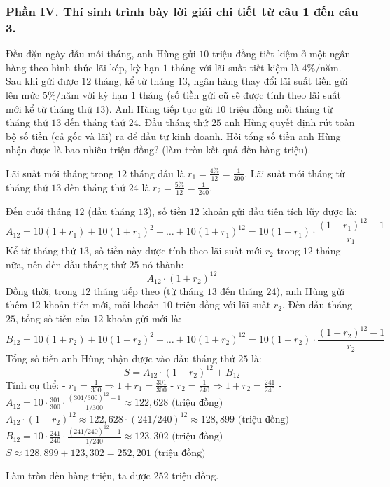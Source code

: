 \subsubsection*{Phần IV. Thí sinh trình bày lời giải chi tiết từ câu 1 đến câu 3.}
\setcounter{bt}{0}
\begin{baitap}
	Đều đặn ngày đầu mỗi tháng, anh Hùng gửi $10$ triệu đồng tiết kiệm ở một ngân hàng theo hình thức lãi kép, kỳ hạn $1$ tháng với lãi suất tiết kiệm là $4\%/\text{năm}$. Sau khi gửi được $12$ tháng, kể từ tháng $13$, ngân hàng thay đổi lãi suất tiền gửi lên mức $5\%/\text{năm}$ với kỳ hạn $1$ tháng (số tiền gửi cũ sẽ được tính theo lãi suất mới kể từ tháng thứ $13$). Anh Hùng tiếp tục gửi $10$ triệu đồng mỗi tháng từ tháng thứ $13$ đến tháng thứ $24$. Đầu tháng thứ $25$ anh Hùng quyết định rút toàn bộ số tiền (cả gốc và lãi) ra để đầu tư kinh doanh. Hỏi tổng số tiền anh Hùng nhận được là bao nhiêu triệu đồng? (làm tròn kết quả đến hàng triệu).
	\begin{traloi}
		
		Lãi suất mỗi tháng trong $12$ tháng đầu là $r_1 = \frac{4\%}{12} = \frac{1}{300}$.
		Lãi suất mỗi tháng từ tháng thứ $13$ đến tháng thứ $24$ là $r_2 = \frac{5\%}{12} = \frac{1}{240}$.
		
		Đến cuối tháng $12$ (đầu tháng $13$), số tiền $12$ khoản gửi đầu tiên tích lũy được là:
		\[
		A_{12} = 10(1 + r_1) + 10(1 + r_1)^2 + \ldots + 10(1 + r_1)^{12} = 10(1 + r_1) \cdot \frac{(1 + r_1)^{12} - 1}{r_1}
		\]
		Kể từ tháng thứ $13$, số tiền này được tính theo lãi suất mới $r_2$ trong $12$ tháng nữa, nên đến đầu tháng thứ $25$ nó thành:
		\[
		A_{12} \cdot (1 + r_2)^{12}
		\]
		Đồng thời, trong $12$ tháng tiếp theo (từ tháng $13$ đến tháng $24$), anh Hùng gửi thêm $12$ khoản tiền mới, mỗi khoản $10$ triệu đồng với lãi suất $r_2$. Đến đầu tháng $25$, tổng số tiền của $12$ khoản gửi mới là:
		\[
		B_{12} = 10(1 + r_2) + 10(1 + r_2)^2 + \ldots + 10(1 + r_2)^{12} = 10(1 + r_2) \cdot \frac{(1 + r_2)^{12} - 1}{r_2}
		\]
		Tổng số tiền anh Hùng nhận được vào đầu tháng thứ $25$ là:
		\[
		S = A_{12} \cdot (1 + r_2)^{12} + B_{12}
		\]
		Tính cụ thể:
		- $r_1 = \frac{1}{300} \Rightarrow 1 + r_1 = \frac{301}{300}$
		- $r_2 = \frac{1}{240} \Rightarrow 1 + r_2 = \frac{241}{240}$
		- $A_{12} = 10 \cdot \frac{301}{300} \cdot \frac{(301/300)^{12} - 1}{1/300} \approx 122{,}628 \text{ (triệu đồng)}$
		- $A_{12} \cdot (1 + r_2)^{12} \approx 122{,}628 \cdot (241/240)^{12} \approx 128{,}899 \text{ (triệu đồng)}$
		- $B_{12} = 10 \cdot \frac{241}{240} \cdot \frac{(241/240)^{12} - 1}{1/240} \approx 123{,}302 \text{ (triệu đồng)}$
		- $S \approx 128{,}899 + 123{,}302 = 252{,}201 \text{ (triệu đồng)}$
		
		Làm tròn đến hàng triệu, ta được $252$ triệu đồng.
	\end{traloi}
\end{baitap}

